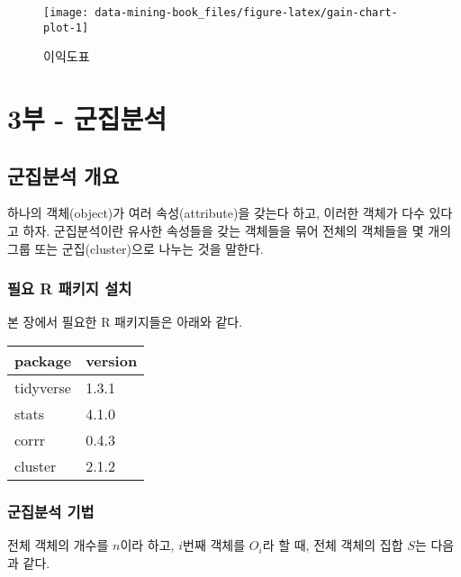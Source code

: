 \documentclass[
]{book}
\begin{document}
\begin{figure}

{\centering \texttt{[image: data-mining-book\_files/figure-latex/gain-chart-plot-1]} 

}

\caption{이익도표}\label{fig:gain-chart-plot}
\end{figure}

\hypertarget{part-3uxbd80---uxad70uxc9d1uxbd84uxc11d}{%
\part{3부 - 군집분석}\label{part-3uxbd80---uxad70uxc9d1uxbd84uxc11d}}

\hypertarget{clustering-overview}{%
\chapter{군집분석 개요}\label{clustering-overview}}

하나의 객체(object)가 여러 속성(attribute)을 갖는다 하고, 이러한 객체가 다수 있다고 하자. 군집분석이란 유사한 속성들을 갖는 객체들을 묶어 전체의 객체들을 몇 개의 그룹 또는 군집(cluster)으로 나누는 것을 말한다.

\hypertarget{clustering-overview-packages-install}{%
\section{필요 R 패키지 설치}\label{clustering-overview-packages-install}}

본 장에서 필요한 R 패키지들은 아래와 같다.

\begin{tabular}{l|l}
\hline
package & version\\
\hline
tidyverse & 1.3.1\\
\hline
stats & 4.1.0\\
\hline
corrr & 0.4.3\\
\hline
cluster & 2.1.2\\
\hline
\end{tabular}

\hypertarget{clustering-method}{%
\section{군집분석 기법}\label{clustering-method}}

전체 객체의 개수를 \(n\)이라 하고, \(i\)번째 객체를 \(O_i\)라 할 때, 전체 객체의 집합 \(S\)는 다음과 같다.
\end{document}
